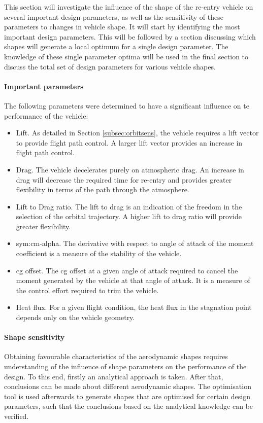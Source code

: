 This section will investigate the influence of the shape of the re-entry vehicle on several important design parameters, as well as the sensitivity of these parameters to changes in vehicle shape. It will start by identifying the most important design parameters. This will be followed by a section discussing which shapes will generate a local optimum for a single design parameter. The knowledge of these single parameter optima will be used in the final section to discuss the total set of design parameters for various vehicle shapes. 


\paragraph{Important parameters}\label{sec:aeroparams}
 The following parameters were determined to have a significant influence on te performance of the vehicle:

\begin{itemize}
	\item{Lift. As detailed in Section \ref{subsec:orbitsens}, the vehicle requires a lift vector to provide flight path control. A larger lift vector provides an increase in flight path control.}
	\item{Drag. The vehicle decelerates purely on atmospheric drag. An increase in drag will decrease the required time for re-entry and provides greater flexibility in terms of the path through the atmosphere. }
	\item{Lift to Drag ratio. The lift to drag is an indication of the freedom in the selection of the orbital trajectory. A higher lift to drag ratio will provide greater flexibility.}
	\item{\gls{sym:cm-alpha}. The derivative with respect to angle of attack of the moment coefficient is a measure of the stability of the vehicle. }
	\item{\gls{cg} offset}. The \gls{cg} offset at a given angle of attack required to cancel the moment generated by the vehicle at that angle of attack. It is a measure of the control effort required to trim the vehicle. 
	\item{Heat flux. For a given flight condition, the heat flux in the stagnation point depends only on the vehicle geometry.  }
\end{itemize}


\paragraph{Shape sensitivity} \label{sec:aerooptima}
Obtaining favourable characteristics of the aerodynamic shapes requires understanding of the influence of shape parameters on the performance of the design. To this end, firstly an analytical approach is taken. After that, conclusions can be made about different aerodynamic shapes. The optimisation tool is used afterwards to generate shapes that are optimised for certain design parameters, such that the conclusions based on the analytical knowledge can be verified.

